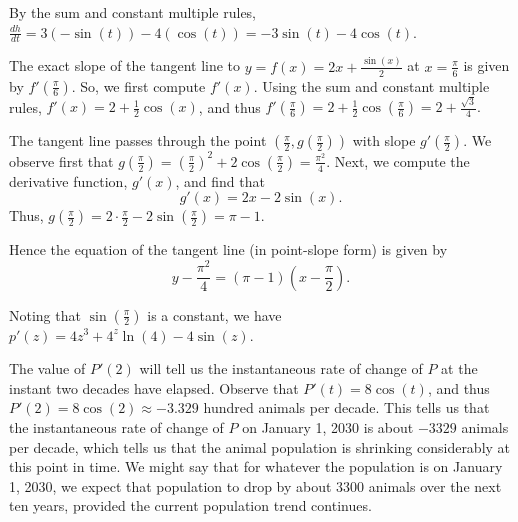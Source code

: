 \begin{activitySolution}
\ba
	\item By the sum and constant multiple rules, $\frac{dh}{dt} = 3(-\sin(t)) - 4(\cos(t)) = -3\sin(t) - 4\cos(t)$.
	\item The exact slope of the tangent line to $y = f(x) = 2x + \frac{\sin(x)}{2}$ at $x = \frac{\pi}{6}$ is given by $f'(\frac{\pi}{6})$.  So, we first compute $f'(x)$.  Using the sum and constant multiple rules, $f'(x) = 2 + \frac{1}{2}\cos(x)$, and thus $f'(\frac{\pi}{6}) = 2 + \frac{1}{2} \cos(\frac{\pi}{6}) = 2 + \frac{\sqrt{3}}{4}.$
	\item The tangent line passes through the point $(\frac{\pi}{2}, g(\frac{\pi}{2}))$ with slope $g'(\frac{\pi}{2})$.  We observe first that $g(\frac{\pi}{2}) = (\frac{\pi}{2})^2 + 2\cos(\frac{\pi}{2}) = \frac{\pi^2}{4}$.  Next, we compute the derivative function, $g'(x)$, and find that
	$$g'(x) = 2x - 2\sin(x).$$
	Thus, $g(\frac{\pi}{2}) = 2 \cdot \frac{\pi}{2} - 2 \sin(\frac{\pi}{2}) = \pi - 1$.
	
	Hence the equation of the tangent line (in point-slope form) is given by 
	$$y - \frac{\pi^2}{4} = (\pi-1)(x-\frac{\pi}{2}).$$
	\item Noting that $\sin(\frac{\pi}{2})$ is a constant, we have $p'(z) = 4z^3 + 4^z \ln(4) - 4\sin(z)$.
	
	\item The value of $P'(2)$ will tell us the instantaneous rate of change of $P$ at the instant two decades have elapsed.  Observe that $P'(t) = 8\cos(t)$, and thus $P'(2) = 8\cos(2) \approx -3.329$ hundred animals per decade.  This tells us that the instantaneous rate of change of $P$ on January 1, 2030 is about $-3329$ animals per decade, which tells us that the animal population is shrinking considerably at this point in time.  We might say that for whatever the population is on January 1, 2030, we expect that population to drop by about 3300 animals over the next ten years, provided the current population trend continues.
\ea
\end{activitySolution}
\aftera